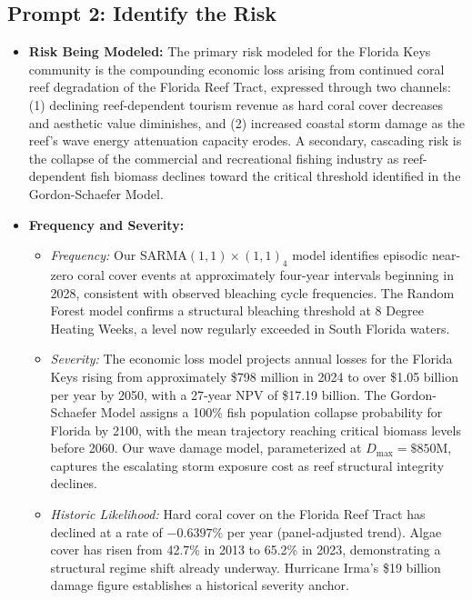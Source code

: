 \documentclass[10pt,letterpaper]{article}
\begin{document}
\subsection*{Prompt 2: Identify the Risk}

\begin{itemize}

    \item \textbf{Risk Being Modeled:} The primary risk modeled for the Florida Keys community is the compounding economic loss arising from continued coral reef degradation of the Florida Reef Tract, expressed through two channels: (1) declining reef-dependent tourism revenue as hard coral cover decreases and aesthetic value diminishes, and (2) increased coastal storm damage as the reef's wave energy attenuation capacity erodes. A secondary, cascading risk is the collapse of the commercial and recreational fishing industry as reef-dependent fish biomass declines toward the critical threshold identified in the Gordon-Schaefer Model.

    \item \textbf{Frequency and Severity:}
    \begin{itemize}
        \item \textit{Frequency:} Our SARMA$(1,1)\times(1,1)_4$ model identifies episodic near-zero coral cover events at approximately four-year intervals beginning in 2028, consistent with observed bleaching cycle frequencies. The Random Forest model confirms a structural bleaching threshold at 8 Degree Heating Weeks, a level now regularly exceeded in South Florida waters.
        \item \textit{Severity:} The economic loss model projects annual losses for the Florida Keys rising from approximately \$798 million in 2024 to over \$1.05 billion per year by 2050, with a 27-year NPV of \$17.19 billion. The Gordon-Schaefer Model assigns a 100\% fish population collapse probability for Florida by 2100, with the mean trajectory reaching critical biomass levels before 2060. Our wave damage model, parameterized at $D_{\max} = \$850\text{M}$, captures the escalating storm exposure cost as reef structural integrity declines.
        \item \textit{Historic Likelihood:} Hard coral cover on the Florida Reef Tract has declined at a rate of $-0.6397\%$ per year (panel-adjusted trend). Algae cover has risen from 42.7\% in 2013 to 65.2\% in 2023, demonstrating a structural regime shift already underway. Hurricane Irma's \$19 billion damage figure establishes a historical severity anchor.
    \end{itemize}


\end{itemize}
\end{document}
